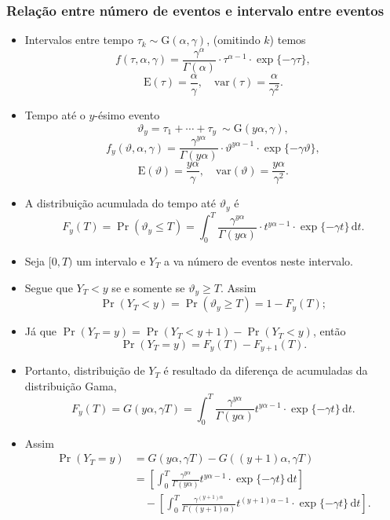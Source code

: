 \documentclass[10pt, aspectratio=169]{beamer}\usepackage[]{graphicx}\usepackage[]{color}
\begin{document}
\begin{frame}[allowframebreaks]
  \frametitle{Relação entre número de eventos e intervalo entre eventos}
  \begin{itemize}
  \item Intervalos entre tempo $\tau_k \sim \text{G}(\alpha,\gamma)$,
  (omitindo $k$) temos
    $$f(\tau, \alpha, \gamma) = \frac{\gamma^\alpha}{\Gamma(\alpha)}
    \cdot \tau^{\alpha-1}\cdot \exp\{-\gamma\tau\},$$
    $$ \text{E}(\tau) = \frac{\alpha}{\gamma}, \quad
    \text{var}(\tau) = \frac{\alpha}{\gamma^2}.$$
  \item Tempo até o $y$-ésimo evento
    $$\vartheta_y = \tau_1+\cdots+\tau_y ~ \sim
    \text{G}(y\alpha, \gamma),$$
    $$f_y(\vartheta, \alpha, \gamma) =
    \frac{\gamma^{y\alpha}}{\Gamma(y\alpha)}\cdot
    \vartheta^{y\alpha-1}\cdot \exp\{-\gamma\vartheta\},$$
    $$ \text{E}(\vartheta) = \frac{y\alpha}{\gamma}, \quad
    \text{var}(\vartheta) = \frac{y\alpha}{\gamma^2}.$$

    \framebreak

  \item A distribuição acumulada do tempo até $\vartheta_{y}$ é
    $$F_y(T) = \Pr(\vartheta_y \leq T) = \int_{0}^{T}
    \frac{\gamma^{y\alpha}}{\Gamma(y\alpha)}\cdot t^{y\alpha-1}\cdot
    \exp\{-\gamma t\}\,\text{d}t.$$
  \item Seja $[0,T)$ um intervalo e $Y_{T}$ a va número de eventos
    neste intervalo.
  \item Segue que $Y_T < y$ se e somente se $\vartheta_y \geq
    T$. Assim
    $$\Pr(Y_T < y) = \Pr(\vartheta_y \geq T) = 1-F_y(T);$$
  \item Já que $\Pr(Y_T = y) = \Pr(Y_T < y+1) - \Pr(Y_T < y)$, então
    $$\Pr(Y_T = y) = F_y(T) - F_{y+1}(T).$$

    \framebreak

  \item Portanto, distribuição de $Y_T$ é resultado da diferença de
    acumuladas da distribuição Gama, 
    \begin{equation}
      F_y(T) = G(y\alpha, \gamma T) =
      \int_{0}^{T} \frac{\gamma^{y\alpha}}{\Gamma(y\alpha)}
      t^{y\alpha-1}\cdot\exp\{-\gamma t\}\, \text{d}t.
    \end{equation}
  \item Assim
    \begin{align*}
      \Pr(Y_T=y) &= G(y\alpha, \gamma T) - G((y+1)\alpha, \gamma T) \\
                 &= \left[ \int_{0}^{T}
                   \frac{\gamma^{y\alpha}}{\Gamma(y\alpha)}
                   t^{y\alpha-1}\cdot
                   \exp\{-\gamma t\}\, \text{d}t \right] \\
                 &\quad -
                   \left[ \int_{0}^{T}
                   \frac{\gamma^{(y+1)\alpha}}{\Gamma((y+1)\alpha)}
                   t^{(y+1)\alpha-1}\cdot
                   \exp\{-\gamma t\}\, \text{d}t \right].
    \end{align*}
  \end{itemize}
\end{frame}
\end{document}
